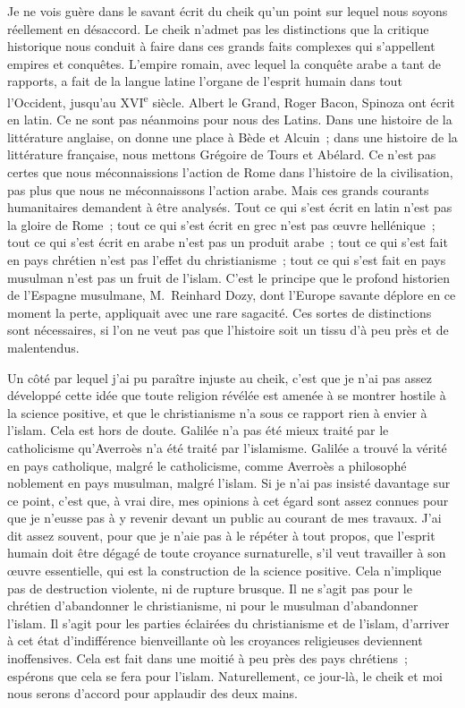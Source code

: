 \documentclass[french,twoside]{book} %
\newcommand\orgName[1]{#1}
\newcommand\persName[1]{#1}
\newcommand\placeName[1]{#1}
\begin{document}
Je ne vois guère dans le savant écrit du cheik qu’un point sur lequel nous soyons réellement en désaccord. Le cheik n’admet pas les distinctions que la critique historique nous conduit à faire dans ces grands faits complexes qui s’appellent empires et conquêtes. L’empire romain, avec lequel la conquête arabe a tant de rapports, a fait de la langue latine l’organe de l’esprit humain dans tout l’{\placeName Occident}, jusqu’au XVI\textsuperscript{e} siècle. {\persName Albert le Grand}, {\persName Roger Bacon}, {\persName Spinoza} ont écrit en latin. Ce ne sont pas néanmoins pour nous des Latins. Dans une histoire de la littérature anglaise, on donne une place à {\persName Bède} et {\persName Alcuin} ; dans une histoire de la littérature française, nous mettons Grégoire de Tours et Abélard. Ce n’est pas certes que nous méconnaissions l’action de {\orgName Rome} dans l’histoire de la civilisation, pas plus que nous ne méconnaissons l’action arabe. Mais ces grands courants humanitaires demandent à être analysés. Tout ce qui s’est écrit en latin n’est pas la gloire de {\orgName Rome} ; tout ce qui s’est écrit en grec n’est pas œuvre hellénique ; tout ce qui s’est écrit en arabe n’est pas un produit arabe ; tout ce qui s’est fait en pays chrétien n’est pas l’effet du christianisme ; tout ce qui s’est fait en pays musulman n’est pas un fruit de l’islam. C’est le principe que le profond historien de l’{\orgName Espagne musulmane}, {\persName M. Reinhard Dozy}, dont l’{\orgName Europe} savante déplore en ce moment la perte, appliquait avec une rare sagacité. Ces sortes de distinctions sont nécessaires, si l’on ne veut pas que l’histoire soit un tissu d’à peu près et de malentendus.\par
Un côté par lequel j’ai pu paraître injuste au cheik, c’est que je n’ai pas assez développé cette idée que toute religion révélée est amenée à se montrer hostile à la science positive, et que le christianisme n’a sous ce rapport rien à envier à l’islam. Cela est hors de doute. {\persName Galilée} n’a pas été mieux traité par le catholicisme qu’{\persName Averroès} n’a été traité par l’islamisme. {\persName Galilée} a trouvé la vérité en pays catholique, malgré le catholicisme, comme {\persName Averroès} a philosophé noblement en pays musulman, malgré l’islam. Si je n’ai pas insisté davantage sur ce point, c’est que, à vrai dire, mes opinions à cet égard sont assez connues pour que je n’eusse pas à y revenir devant un public au courant de mes travaux. J’ai dit assez souvent, pour que je n’aie pas à le répéter à tout propos, que l’esprit humain doit être dégagé de toute croyance surnaturelle, s’il veut travailler à son œuvre essentielle, qui est la construction de la science positive. Cela n’implique pas de destruction violente, ni de rupture brusque. Il ne s’agit pas pour le chrétien d’abandonner le christianisme, ni pour le musulman d’abandonner l’islam. Il s’agit pour les parties éclairées du christianisme et de l’islam, d’arriver à cet état d’indifférence bienveillante où les croyances religieuses deviennent inoffensives. Cela est fait dans une moitié à peu près des pays chrétiens ; espérons que cela se fera pour l’islam. Naturellement, ce jour-là, le cheik et moi nous serons d’accord pour applaudir des deux mains.\par
\end{document}
